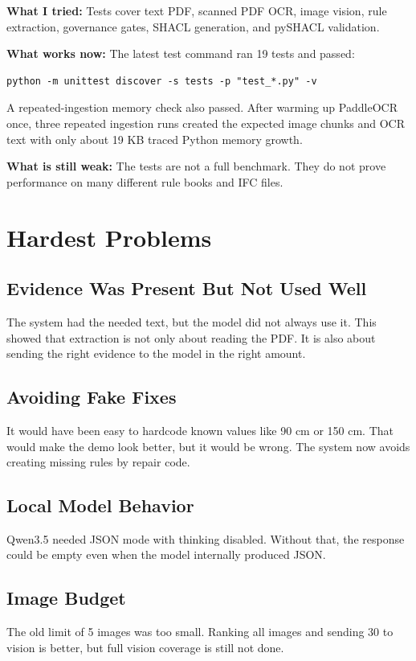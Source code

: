 \documentclass[11pt,a4paper]{article}
\begin{document}
\textbf{What I tried:}
Tests cover text PDF, scanned PDF OCR, image vision, rule extraction, governance gates, SHACL generation, and pySHACL validation.

\textbf{What works now:}
The latest test command ran 19 tests and passed:

\begin{verbatim}
python -m unittest discover -s tests -p "test_*.py" -v
\end{verbatim}

A repeated-ingestion memory check also passed. After warming up PaddleOCR once, three repeated ingestion runs created the expected image chunks and OCR text with only about 19 KB traced Python memory growth.

\textbf{What is still weak:}
The tests are not a full benchmark. They do not prove performance on many different rule books and IFC files.

\section{Hardest Problems}
\subsection{Evidence Was Present But Not Used Well}
The system had the needed text, but the model did not always use it. This showed that extraction is not only about reading the PDF. It is also about sending the right evidence to the model in the right amount.

\subsection{Avoiding Fake Fixes}
It would have been easy to hardcode known values like 90 cm or 150 cm. That would make the demo look better, but it would be wrong. The system now avoids creating missing rules by repair code.

\subsection{Local Model Behavior}
Qwen3.5 needed JSON mode with thinking disabled. Without that, the response could be empty even when the model internally produced JSON.

\subsection{Image Budget}
The old limit of 5 images was too small. Ranking all images and sending 30 to vision is better, but full vision coverage is still not done.
\end{document}
